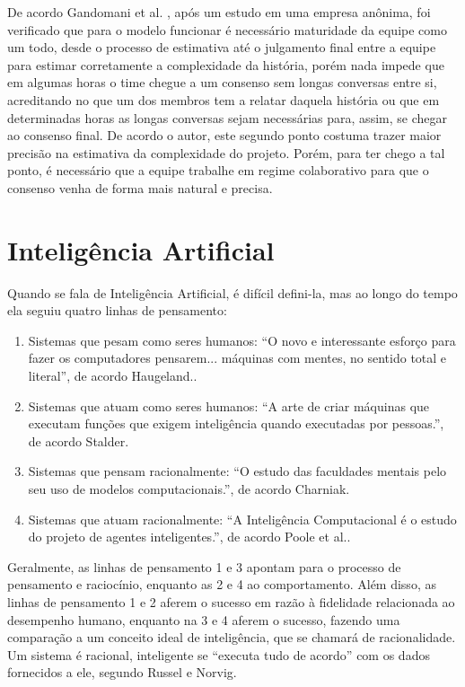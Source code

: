 De acordo Gandomani et al. \cite{gandomani}, após um estudo em uma empresa anônima, foi verificado que para o modelo funcionar é necessário maturidade da equipe como um todo, desde o processo de estimativa até o julgamento final entre a equipe para estimar corretamente a complexidade da história, porém nada impede que em algumas horas o time chegue a um consenso sem longas conversas entre si, acreditando no que um dos membros tem a relatar daquela história ou que em determinadas horas as longas conversas sejam necessárias para, assim, se chegar ao consenso final. De acordo o autor, este segundo ponto costuma trazer maior precisão na estimativa da complexidade do projeto. Porém, para ter chego a tal ponto, é necessário que a equipe trabalhe em regime colaborativo para que o consenso venha de forma mais natural e precisa.

\section{Inteligência Artificial}

Quando se fala de Inteligência Artificial, é difícil defini-la, mas ao longo do tempo ela seguiu quatro linhas de pensamento:

\begin{enumerate}
    \item Sistemas que pesam como seres humanos: “O novo e interessante esforço para fazer os computadores pensarem... máquinas com mentes, no sentido total e literal”, de acordo Haugeland.\cite{haugeland}.
    \item Sistemas que atuam como seres humanos: “A arte de criar máquinas que executam funções que exigem inteligência quando executadas por pessoas.”, de acordo Stalder\cite{stalder}.
    \item Sistemas que pensam racionalmente: “O estudo das faculdades mentais pelo seu uso de modelos computacionais.”, de acordo Charniak\cite{charniak}.
    \item Sistemas que atuam racionalmente: “A Inteligência Computacional é o estudo do projeto de agentes inteligentes.”, de acordo Poole et al.\cite{Poole}.
\end{enumerate}


Geralmente, as linhas de pensamento 1 e 3 apontam para o processo de pensamento e raciocínio, enquanto as 2 e 4 ao comportamento. Além disso, as linhas de pensamento 1 e 2 aferem o sucesso em razão à fidelidade relacionada ao desempenho humano, enquanto na 3 e 4 aferem o sucesso, fazendo uma comparação a um conceito ideal de inteligência, que se chamará de racionalidade. Um sistema é racional, inteligente se “executa tudo de acordo” com os dados fornecidos a ele, segundo Russel e Norvig\cite{russelnorvig}.

